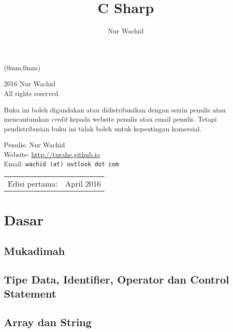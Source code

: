 \documentclass[11pt,b5paper,oneside,titlepage]{book}
\begin{document}
	\begin{textblock*}{297mm}(0mm,0mm)
	\end{textblock*}
	\cleardoublepage
	\frontmatter
	\author{Nur Wachid}
	\title{C Sharp}
	\maketitle
	\begingroup
	\footnotesize
	\parindent 0pt
	\parskip \baselineskip
	
	
	\textcopyright{} 2016 Nur Wachid \\
	All rights reserved.
	
	Buku ini boleh digandakan atau didistribusikan dengan
	seizin penulis atau mencantumkan \emph{credit} kepada
	website penulis atau email penulis. Tetapi pendistribusian
	buku ini tidak boleh untuk kepentingan komersial.
	
	Penulis: Nur Wachid \\
	Website: \url{http://turahe.github.io}  \\
	Email: \texttt{wachid  (at) outlook dot com}
	
	\begin{center}
		\begin{tabular}{ll}
			Edisi pertama:  & April 2016 \\
		\end{tabular}
	\end{center}
	\newpage
	
	\endgroup
	\tableofcontents
	\mainmatter
	
	\part{Dasar}
	\chapter{Mukadimah}\label{mukadimah}
	
	
	\chapter{Tipe Data, Identifier, Operator dan Control Statement}\label{tipe-data-identifier-operator-dan-control-statement}
	
	
	\chapter{Array dan String}\label{array-dan-string}
	
	
\end{document}
